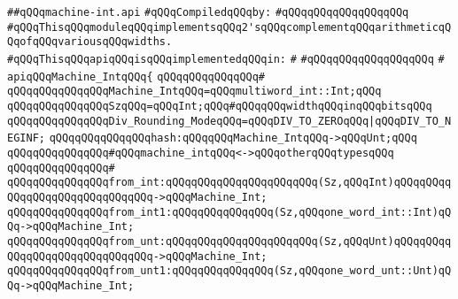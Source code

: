 \label{src/lib/compiler/back/low/treecode/machine-int.api}
\verb|##qQQqmachine-int.api|\newline
\newline
\verb|#qQQqCompiledqQQqby:|\newline
\verb|#qQQqqQQqqQQqqQQqqQQq|\newline
\newline
\verb|#qQQqThisqQQqmoduleqQQqimplementsqQQq2'sqQQqcomplementqQQqarithmeticqQQqofqQQqvariousqQQqwidths.|\newline
\newline
\verb|#qQQqThisqQQqapiqQQqisqQQqimplementedqQQqin:|\newline
\verb|#|\newline
\verb|#qQQqqQQqqQQqqQQqqQQq|\newline
\verb|#|\newline
\verb|apiqQQqMachine_IntqQQq{|\newline
\verb|qQQqqQQqqQQqqQQq#|\newline
\verb|qQQqqQQqqQQqqQQqMachine_IntqQQq=qQQqmultiword_int::Int;qQQq|\newline
\verb|qQQqqQQqqQQqqQQqSzqQQq=qQQqInt;qQQq#qQQqqQQqwidthqQQqinqQQqbitsqQQq|\newline
\newline
\verb|qQQqqQQqqQQqqQQqDiv_Rounding_ModeqQQq=qQQqDIV_TO_ZEROqQQq|\verb#|qQQqDIV_TO_NEGINF;#\newline
\newline
\verb|qQQqqQQqqQQqqQQqhash:qQQqqQQqMachine_IntqQQq->qQQqUnt;qQQq|\newline
\newline
\verb|qQQqqQQqqQQqqQQq#qQQqmachine_intqQQq<->qQQqotherqQQqtypesqQQq|\newline
\verb|qQQqqQQqqQQqqQQq#|\newline
\verb|qQQqqQQqqQQqqQQqfrom_int:qQQqqQQqqQQqqQQqqQQqqQQq(Sz,qQQqInt)qQQqqQQqqQQqqQQqqQQqqQQqqQQqqQQq->qQQqMachine_Int;|\newline
\verb|qQQqqQQqqQQqqQQqfrom_int1:qQQqqQQqqQQqqQQq(Sz,qQQqone_word_int::Int)qQQq->qQQqMachine_Int;|\newline
\verb|qQQqqQQqqQQqqQQqfrom_unt:qQQqqQQqqQQqqQQqqQQqqQQq(Sz,qQQqUnt)qQQqqQQqqQQqqQQqqQQqqQQqqQQqqQQq->qQQqMachine_Int;|\newline
\verb|qQQqqQQqqQQqqQQqfrom_unt1:qQQqqQQqqQQqqQQq(Sz,qQQqone_word_unt::Unt)qQQq->qQQqMachine_Int;|\newline
